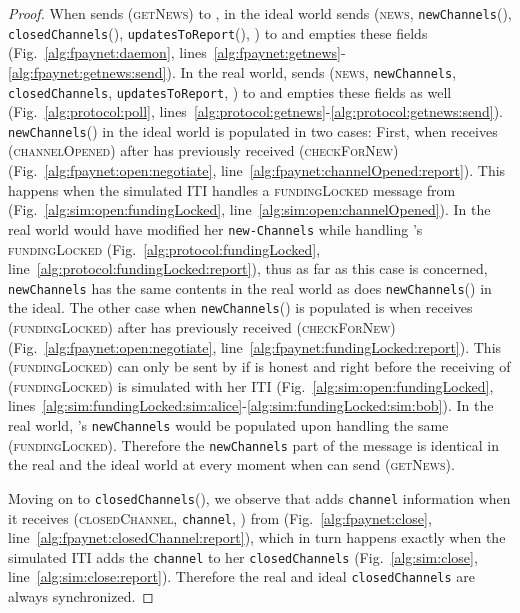 \begin{proof}
  When \environment{} sends (\textsc{getNews}) to \alice, in the ideal world
  \fpaynet{} sends (\textsc{news}, \texttt{newChannels}(\alice),
  \texttt{closedChannels}(\alice), \texttt{updatesToReport}(\alice),
  ) to \environment{} and empties
  these fields (Fig.~\ref{alg:fpaynet:daemon},
  lines~\ref{alg:fpaynet:getnews}-\ref{alg:fpaynet:getnews:send}). In the real
  world, \alice{} sends (\textsc{news}, \texttt{newChannels},
  \texttt{closedChannels}, \texttt{updatesToReport},
  ) to \environment{} and empties these fields
  as well (Fig.~\ref{alg:protocol:poll},
  lines~\ref{alg:protocol:getnews}-\ref{alg:protocol:getnews:send}).
  \texttt{newChannels}(\alice) in the ideal world is populated in two cases:
  First, when \fpaynet{} receives (\textsc{channelOpened}) after \alice{} has
  previously received (\textsc{checkForNew})
  (Fig.~\ref{alg:fpaynet:open:negotiate},
  line~\ref{alg:fpaynet:channelOpened:report}). This happens when the simulated
  \alice{} ITI handles a \textsc{fundingLocked} message from \bob{}
  (Fig.~\ref{alg:sim:open:fundingLocked},
  line~\ref{alg:sim:open:channelOpened}). In the real world \alice{} would have
  modified her \texttt{new-Channels} while handling \bob's
  \textsc{fundingLocked} (Fig.~\ref{alg:protocol:fundingLocked},
  line~\ref{alg:protocol:fundingLocked:report}), thus as far as this case is
  concerned, \texttt{newChannels} has the same contents in the real world as
  does \texttt{newChannels}(\alice) in the ideal. The other case when
  \texttt{newChannels}(\alice) is populated is when \fpaynet{} receives
  (\textsc{fundingLocked}) after \bob{} has previously received
  (\textsc{checkForNew}) (Fig.~\ref{alg:fpaynet:open:negotiate},
  line~\ref{alg:fpaynet:fundingLocked:report}). This (\textsc{fundingLocked})
  can only be sent by \simulator{} if \alice{} is honest and right before the
  receiving of (\textsc{fundingLocked}) is simulated with her ITI
  (Fig.~\ref{alg:sim:open:fundingLocked},
  lines~\ref{alg:sim:fundingLocked:sim:alice}-\ref{alg:sim:fundingLocked:sim:bob}).
  In the real world, \alice's \texttt{newChannels} would be populated upon
  handling the same (\textsc{fundingLocked}). Therefore the \texttt{newChannels}
  part of the message is identical in the real and the ideal world at every
  moment when \environment{} can send (\textsc{getNews}).

  Moving on to \texttt{closedChannels}(\alice), we observe that \fpaynet{} adds
  \texttt{channel} information when it receives (\textsc{closedChannel},
  \texttt{channel}, \alice) from \simulator{} (Fig.~\ref{alg:fpaynet:close},
  line~\ref{alg:fpaynet:closedChannel:report}), which in turn happens exactly
  when the simulated \alice{} ITI adds the \texttt{channel} to her
  \texttt{closedChannels} (Fig.~\ref{alg:sim:close},
  line~\ref{alg:sim:close:report}). Therefore the real and ideal
  \texttt{closedChannels} are always synchronized.


\end{proof}
